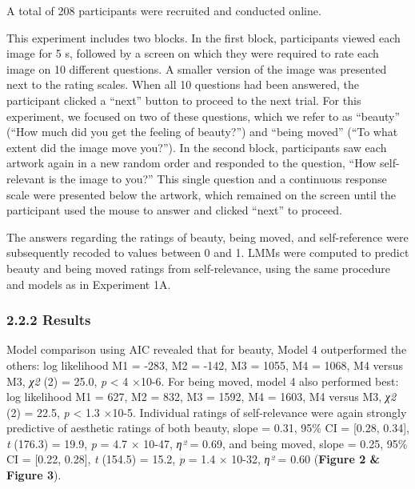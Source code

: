 \documentclass[
  man]{apa6}
\begin{document}
A total of 208 participants were recruited and conducted online.

This experiment includes two blocks. In the first block, participants viewed each image for 5 s, followed by a screen on which they were required to rate each image on 10 different questions. A smaller version of the image was presented next to the rating scales. When all 10 questions had been answered, the participant clicked a ``next'' button to proceed to the next trial. For this experiment, we focused on two of these questions, which we refer to as ``beauty'' (``How much did you get the feeling of beauty?'') and ``being moved'' (``To what extent did the image move you?''). In the second block, participants saw each artwork again in a new random order and responded to the question, ``How self-relevant is the image to you?'' This single question and a continuous response scale were presented below the artwork, which remained on the screen until the participant used the mouse to answer and clicked ``next'' to proceed.

The answers regarding the ratings of beauty, being moved, and self-reference were subsequently recoded to values between 0 and 1. LMMs were computed to predict beauty and being moved ratings from self-relevance, using the same procedure and models as in Experiment 1A.

\hypertarget{results-1}{%
\subsubsection{2.2.2 Results}\label{results-1}}

Model comparison using AIC revealed that for beauty, Model 4 outperformed the others: log likelihood M1 = -283, M2 = -142, M3 = 1055, M4 = 1068, M4 versus M3, \emph{χ2} (2) = 25.0, \emph{p} \textless{} 4 ×10-6. For being moved, model 4 also performed best: log likelihood M1 = 627, M2 = 832, M3 = 1592, M4 = 1603, M4 versus M3, \emph{χ2} (2) = 22.5, \emph{p} \textless{} 1.3 ×10-5.
Individual ratings of self-relevance were again strongly predictive of aesthetic ratings of both beauty, slope = 0.31, 95\% CI = {[}0.28, 0.34{]}, \emph{t} (176.3) = 19.9, \emph{p} = 4.7 × 10-47, \emph{η²} = 0.69, and being moved, slope = 0.25, 95\% CI = {[}0.22, 0.28{]}, \emph{t} (154.5) = 15.2, \emph{p} = 1.4 × 10-32, \emph{η²} = 0.60 (\textbf{Figure 2 \& Figure 3}).
\end{document}
